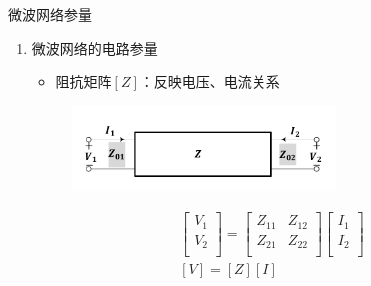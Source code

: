 \begin{frame}{微波网络参量}
    \begin{enumerate}
        \item 微波网络的电路参量
              \begin{itemize}
                  \item 阻抗矩阵$[Z]$：反映电压、电流关系
              \end{itemize}
              \begin{figure}
                  \includegraphics[width=7cm]{Cha5//fig5-6.pdf}
              \end{figure}
              \begin{gather}
                  \begin{bmatrix*}
                      V_1\\
                      V_2\\
                  \end{bmatrix*}
                  =
                  \begin{bmatrix*}
                      Z_{11} & Z_{12}\\
                      Z_{21} & Z_{22}\\
                  \end{bmatrix*}
                  \begin{bmatrix*}
                      I_1 \\
                      I_2 \\
                  \end{bmatrix*}\label{eqn5-1}\\
                  [V]=[Z][I]\label{eqn5-2}
              \end{gather}
    \end{enumerate}
\end{frame}

